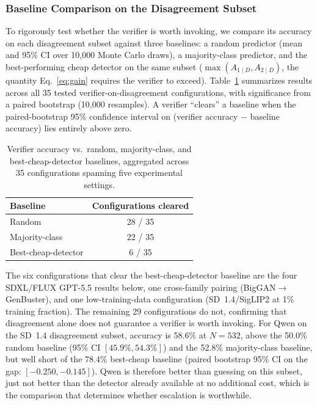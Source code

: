 \documentclass{ieeeaccess}
\begin{document}
\subsubsection{Baseline Comparison on the Disagreement Subset}
\label{sec:baseline_comparison}

To rigorously test whether the verifier is worth invoking, we compare its
accuracy on each disagreement subset against three baselines: a random
predictor (mean and 95\% CI over 10{,}000 Monte Carlo draws), a
majority-class predictor, and the best-performing cheap detector on the
same subset ($\max(A_{1\mid D}, A_{2\mid D})$, the quantity
Eq.~\eqref{eq:gain} requires the verifier to exceed). Table~\ref{tab:baselines}
summarizes results across all 35 tested verifier-on-disagreement
configurations, with significance from a paired bootstrap (10{,}000
resamples). A verifier ``clears'' a baseline when the paired-bootstrap 95\%
confidence interval on (verifier accuracy $-$ baseline accuracy) lies
entirely above zero.

\begin{table}[h]
\centering
\small
\caption{Verifier accuracy vs.\ random, majority-class, and best-cheap-detector baselines, aggregated across 35 configurations spanning five experimental settings.}
\label{tab:baselines}
\begin{tabular}{lc}
\toprule
Baseline & Configurations cleared \\
\midrule
Random          & 28 / 35 \\
Majority-class  & 22 / 35 \\
Best-cheap-detector & 6 / 35 \\
\bottomrule
\end{tabular}
\end{table}

The six configurations that clear the best-cheap-detector baseline are the
four SDXL/FLUX GPT-5.5 results below, one cross-family pairing
(BigGAN$\to$GenBuster), and one low-training-data configuration
(SD~1.4/SigLIP2 at 1\% training fraction). The remaining 29 configurations
do not, confirming that disagreement alone does not guarantee a verifier is
worth invoking. For Qwen on the SD~1.4 disagreement subset, accuracy is
58.6\% at $N{=}532$,
above the 50.0\% random baseline (95\% CI $[45.9\%, 54.3\%]$) and the
52.8\% majority-class baseline, but well short of the 78.4\% best-cheap
baseline (paired bootstrap 95\% CI on the gap: $[-0.250,-0.145]$). Qwen is
therefore better than guessing on this subset, just not better than the
detector already available at no additional cost, which is the comparison
that determines whether escalation is worthwhile.
\end{document}
